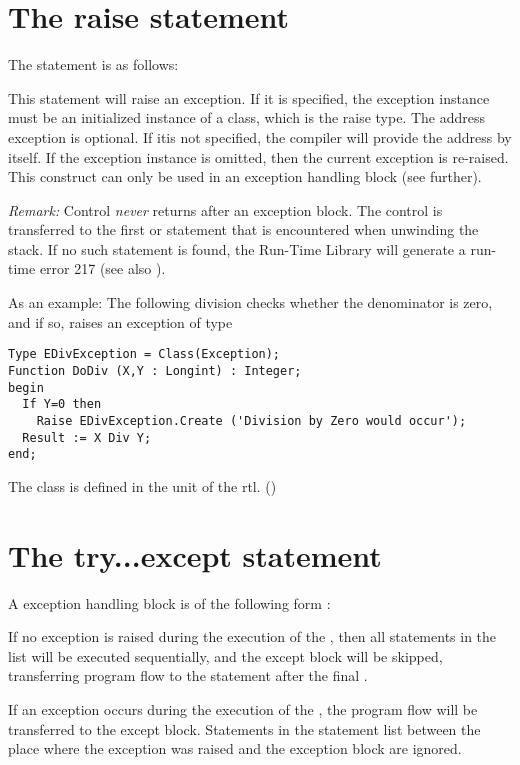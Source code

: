 \documentclass{report}
\begin{document}
\section{The raise statement}
The  statement is as follows:

This statement will raise an exception. If it is specified, the exception
instance must be an initialized instance of a class, which is the raise
type. The address exception is optional. If itis not specified, the compiler
will provide the address by itself.
If the exception instance is omitted, then the current exception is
re-raised. This construct can only be used in an exception handling
block (see further).

{\em Remark:} Control {\em never} returns after an exception block. The
control is transferred to the first  or
 statement that is encountered when unwinding the stack.
If no such statement is found, the \fpc Run-Time Library will generate a
run-time error 217 (see also ).

As an example: The following division checks whether the denominator is
zero, and if so, raises an exception of type 
\begin{verbatim}
Type EDivException = Class(Exception);
Function DoDiv (X,Y : Longint) : Integer;
begin
  If Y=0 then
    Raise EDivException.Create ('Division by Zero would occur');
  Result := X Div Y;
end;
\end{verbatim}
The class  is defined in the  unit of the rtl.
()

\section{The try...except statement}
A  exception handling block is of the following form :

If no exception is raised during the execution of the ,
then all statements in the list will be executed sequentially, and the
except block will be skipped, transferring program flow to the statement
after the final .

If an exception occurs during the execution of the , the
program flow will be transferred to the except block. Statements in the
statement list between the place where the exception was raised and the
exception block are ignored.
\end{document}
